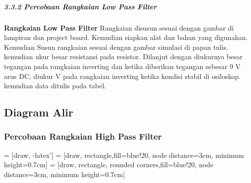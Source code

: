 \documentclass[12pt,a4paper]{article}
\begin{document}
\subparagraph{3.3.2 Percobaan Rangkaian Low Pass Filter }
\subparagraph{ }
	\textbf{Rangkaian Low Pass Filter} Rangkaian disusun sesuai dengan gambar di lampiran dan project board. Kemudian siapkan alat dan bahan yang digunakan. Kemudian Susun rangkaian sesuai dengan gambar simulasi di papan tulis. kemudian ukur besar resistansi pada resistor. Dilanjut dengan diukurnya besar tegangan pada rangkaian inverting dan ketika diberikan tegangan sebesar 9 V arus DC, diukur  V pada rangkaian inverting ketika kondisi stabil di osiloskop. kemudian data ditulis pada tabel.

\subsection{Diagram Alir}
\subsubsection{Percobaan Rangkaian High Pass Filter }
 = [draw, -latex']
 = [draw, rectangle,fill=blue!20, node distance=3cm,
    minimum height=0.7cm]
 = [draw, rectangle, rounded corners,fill=blue!20, node distance=3cm,
    minimum height=0.7cm]
\end{document}
